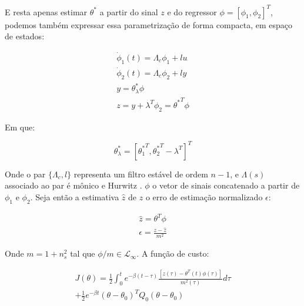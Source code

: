 \documentclass[conference,harvard,brazil,english]{sbatex}
\begin{document}
E resta apenas estimar $\theta^*$ a partir do sinal $z$ e do regressor $\phi = [\phi_1, \phi_2]^T$, podemos também expressar essa parametrização de forma compacta, em espaço de estados: 

\begin{equation}
\label{eq:sigmaIDMARC}
\displaystyle 
\begin{array}{l}

        \dot{\phi}_1(t) = \Lambda_c \phi_1 + lu       \\
        \dot{\phi}_2(t) = \Lambda_c \phi_2 + ly       \\
        y = \theta^*_\lambda \phi                     \\
        z = y + \lambda^T\phi_2 = {\theta^*}^T \phi  
         
\end{array}
\end{equation}

Em que:

\begin{equation*}
\theta^*_\lambda = [{\theta_1^*}^T, {\theta_2^*}^T - \lambda^T]^T
\end{equation*}

Onde o par  $\{ \Lambda_c, l \}$ representa um filtro estável de ordem $n-1$, e $\Lambda(s)$ associado ao par é mônico e Hurwitz . $\phi$ o vetor de sinais concatenado a partir de $\phi_1$ e $\phi_2$. Seja então a estimativa $\hat{z}$ de $z$ o erro de estimação normalizado $\epsilon$:

\begin{equation}
\displaystyle 
\begin{array}{l}

        \hat{z} = \theta^T \phi \\
        \epsilon = \frac{z - \hat{z}}{m^2}
         
\end{array}
\end{equation}

Onde $m = 1+n_s^2$ tal que $\phi/m \in \mathcal{L}_\infty$. A função de custo:

\begin{equation}
\displaystyle 
\begin{array}{r}

       J(\theta) = \frac{1}{2} \int_{0}^{t} e^{-\beta(t - \tau)} \frac{[z(\tau) - \theta^T(t)\phi(\tau)]}{m^2(\tau)} d\tau \\
        + \frac{1}{2} e^{-\beta t}(\theta - \theta_0)^TQ_0(\theta - \theta_0)
         
\end{array}
\end{equation}
\end{document}
